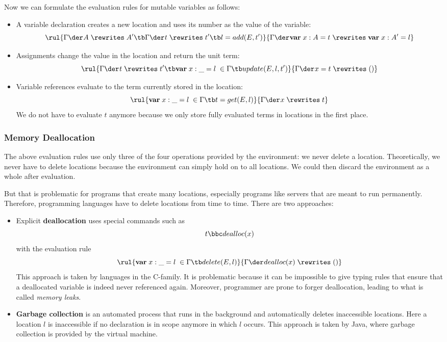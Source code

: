 Now we can formulate the evaluation rules for mutable variables as follows:
\begin{itemize}
\item A variable declaration creates a new location and uses its number as the value of the variable:
\[\rul{\evobj{}{\Gamma}{A}{A'}\tb \evobj{}{\Gamma}{t}{t'} \tb l=add(E,t')}
      {\evdec{}{\Gamma}{\amval{x}{A}{t}}{\amval{x}{A'}{l}}}
\]
\item Assignments change the value in the location and return the unit term:
\[\rul{\evobj{}{\Gamma}{t}{t'}\tb \amval{x}{\_}{l}\;\in\Gamma \tb update(E,l,t')}
      {\evobj{}{\Gamma}{x=t}{()}}
\]
\item Variable references evaluate to the term currently stored in the location:
\[\rul{\amval{x}{\_}{l}\;\in\Gamma \tb t=get(E,l)}
      {\evobj{}{\Gamma}{x}{t}}
\]
We do not have to evaluate $t$ anymore because we only store fully evaluated terms in locations in the first place.
\end{itemize}


\subsubsection{Memory Deallocation}

The above evaluation rules use only three of the four operations provided by the environment: we never delete a location.
Theoretically, we never have to delete locations because the environment can simply hold on to all locations.
We could then discard the environment as a whole after evaluation.

But that is problematic for programs that create many locations, especially programs like servers that are meant to run permanently.
Therefore, programming languages have to delete locations from time to time.
There are two approaches:
\begin{itemize}
\item Explicit \textbf{deallocation} uses special commands such as
 \[t \bbc dealloc(x)\]
with the evaluation rule
\[\rul{\amval{x}{\_}{l}\;\in\Gamma \tb delete(E,l)}
      {\evobj{}{\Gamma}{dealloc(x)}{()}}
\]
This approach is taken by languages in the C-family.
It is problematic because it can be impossible to give typing rules that ensure that a deallocated variable is indeed never referenced again.
Moreover, programmer are prone to forger deallocation, leading to what is called \emph{memory leaks}.
\item \textbf{Garbage collection} is an automated process that runs in the background and automatically deletes inaccessible locations.
Here a location $l$ is inaccessible if no declaration is in scope anymore in which $l$ occurs.
This approach is taken by Java, where garbage collection is provided by the virtual machine.
\end{itemize}

